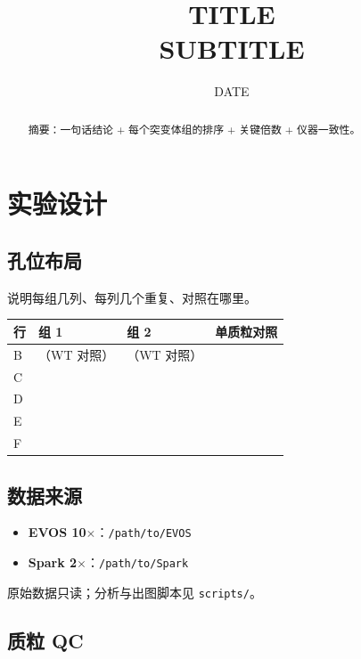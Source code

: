 \documentclass[UTF8, a4paper, 11pt]{ctexart}
\title{\vspace{-1.6cm}\bfseries {{TITLE}}\\[2pt]
\large {{SUBTITLE}}}
\author{}
\date{ {{DATE}} }
\begin{document}
\maketitle
\vspace{-0.9cm}

\begin{abstract}
\noindent
{{摘要：一句话结论 + 每个突变体组的排序 + 关键倍数 + 仪器一致性。}}
\end{abstract}

\section{实验设计}

\subsection{孔位布局}

{{说明每组几列、每列几个重复、对照在哪里。}}

\begin{center}
\label{tab:layout}
\small
\begin{tabular}{@{}llll@{}}
\toprule
行 & 组 1 & 组 2 & 单质粒对照\\
\midrule
B & （WT 对照） & （WT 对照） &  \\
C &  &  &  \\
D &  &  &  \\
E &  &  &  \\
F &  &  &  \\
\bottomrule
\end{tabular}
\end{center}

\subsection{数据来源}

\begin{itemize}
  \item \textbf{EVOS 10$\times$}：\texttt{/path/to/EVOS}
  \item \textbf{Spark 2$\times$}：\texttt{/path/to/Spark}
\end{itemize}

原始数据只读；分析与出图脚本见 \texttt{scripts/}。

\subsection{质粒 QC}
\end{document}

